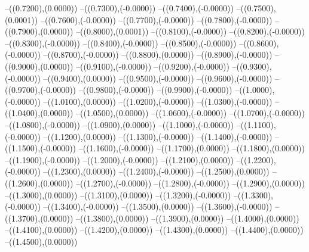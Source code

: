 {	--({\sx*(0.7200)},{\sy*(0.0000)})
	--({\sx*(0.7300)},{\sy*(-0.0000)})
	--({\sx*(0.7400)},{\sy*(-0.0000)})
	--({\sx*(0.7500)},{\sy*(0.0001)})
	--({\sx*(0.7600)},{\sy*(-0.0000)})
	--({\sx*(0.7700)},{\sy*(-0.0000)})
	--({\sx*(0.7800)},{\sy*(-0.0000)})
	--({\sx*(0.7900)},{\sy*(0.0000)})
	--({\sx*(0.8000)},{\sy*(0.0001)})
	--({\sx*(0.8100)},{\sy*(-0.0000)})
	--({\sx*(0.8200)},{\sy*(-0.0000)})
	--({\sx*(0.8300)},{\sy*(-0.0000)})
	--({\sx*(0.8400)},{\sy*(-0.0000)})
	--({\sx*(0.8500)},{\sy*(-0.0000)})
	--({\sx*(0.8600)},{\sy*(-0.0000)})
	--({\sx*(0.8700)},{\sy*(-0.0000)})
	--({\sx*(0.8800)},{\sy*(0.0000)})
	--({\sx*(0.8900)},{\sy*(-0.0000)})
	--({\sx*(0.9000)},{\sy*(0.0000)})
	--({\sx*(0.9100)},{\sy*(-0.0000)})
	--({\sx*(0.9200)},{\sy*(-0.0000)})
	--({\sx*(0.9300)},{\sy*(-0.0000)})
	--({\sx*(0.9400)},{\sy*(0.0000)})
	--({\sx*(0.9500)},{\sy*(-0.0000)})
	--({\sx*(0.9600)},{\sy*(-0.0000)})
	--({\sx*(0.9700)},{\sy*(-0.0000)})
	--({\sx*(0.9800)},{\sy*(-0.0000)})
	--({\sx*(0.9900)},{\sy*(-0.0000)})
	--({\sx*(1.0000)},{\sy*(-0.0000)})
	--({\sx*(1.0100)},{\sy*(0.0000)})
	--({\sx*(1.0200)},{\sy*(-0.0000)})
	--({\sx*(1.0300)},{\sy*(-0.0000)})
	--({\sx*(1.0400)},{\sy*(0.0000)})
	--({\sx*(1.0500)},{\sy*(0.0000)})
	--({\sx*(1.0600)},{\sy*(-0.0000)})
	--({\sx*(1.0700)},{\sy*(-0.0000)})
	--({\sx*(1.0800)},{\sy*(-0.0000)})
	--({\sx*(1.0900)},{\sy*(0.0000)})
	--({\sx*(1.1000)},{\sy*(-0.0000)})
	--({\sx*(1.1100)},{\sy*(-0.0000)})
	--({\sx*(1.1200)},{\sy*(0.0000)})
	--({\sx*(1.1300)},{\sy*(-0.0000)})
	--({\sx*(1.1400)},{\sy*(-0.0000)})
	--({\sx*(1.1500)},{\sy*(-0.0000)})
	--({\sx*(1.1600)},{\sy*(-0.0000)})
	--({\sx*(1.1700)},{\sy*(0.0000)})
	--({\sx*(1.1800)},{\sy*(0.0000)})
	--({\sx*(1.1900)},{\sy*(-0.0000)})
	--({\sx*(1.2000)},{\sy*(-0.0000)})
	--({\sx*(1.2100)},{\sy*(0.0000)})
	--({\sx*(1.2200)},{\sy*(-0.0000)})
	--({\sx*(1.2300)},{\sy*(0.0000)})
	--({\sx*(1.2400)},{\sy*(-0.0000)})
	--({\sx*(1.2500)},{\sy*(0.0000)})
	--({\sx*(1.2600)},{\sy*(0.0000)})
	--({\sx*(1.2700)},{\sy*(-0.0000)})
	--({\sx*(1.2800)},{\sy*(-0.0000)})
	--({\sx*(1.2900)},{\sy*(0.0000)})
	--({\sx*(1.3000)},{\sy*(0.0000)})
	--({\sx*(1.3100)},{\sy*(0.0000)})
	--({\sx*(1.3200)},{\sy*(-0.0000)})
	--({\sx*(1.3300)},{\sy*(-0.0000)})
	--({\sx*(1.3400)},{\sy*(-0.0000)})
	--({\sx*(1.3500)},{\sy*(0.0000)})
	--({\sx*(1.3600)},{\sy*(-0.0000)})
	--({\sx*(1.3700)},{\sy*(0.0000)})
	--({\sx*(1.3800)},{\sy*(0.0000)})
	--({\sx*(1.3900)},{\sy*(0.0000)})
	--({\sx*(1.4000)},{\sy*(0.0000)})
	--({\sx*(1.4100)},{\sy*(0.0000)})
	--({\sx*(1.4200)},{\sy*(0.0000)})
	--({\sx*(1.4300)},{\sy*(0.0000)})
	--({\sx*(1.4400)},{\sy*(0.0000)})
	--({\sx*(1.4500)},{\sy*(0.0000)})
}
